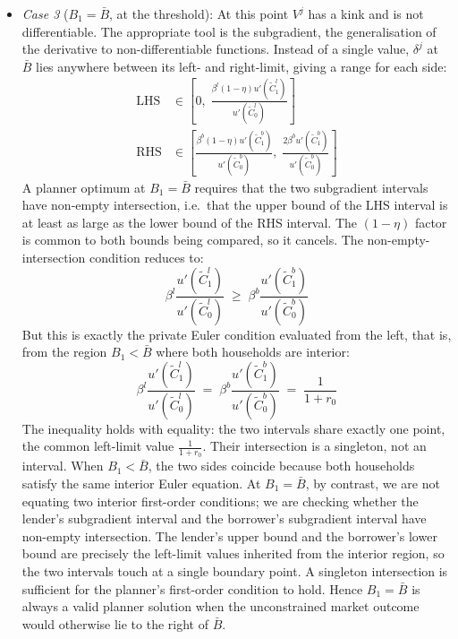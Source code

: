 \documentclass[11pt,a4paper]{article}
\begin{document}
\begin{itemize}
    \item \textit{Case 3} ($B_1 = \bar{B}$, at the threshold): At this point $V^j$ has a kink and is not differentiable. The appropriate tool is the subgradient, the generalisation of the derivative to non-differentiable functions. Instead of a single value, $\delta^j$ at $\bar{B}$ lies anywhere between its left- and right-limit, giving a range for each side:
    \begin{equation}
    \begin{aligned}
    \text{LHS} &\in \left[0,\; \frac{\beta^l(1-\eta)u'(\tilde{C}_1^l)}{u'(\tilde{C}_0^l)}\right] \\[4pt]
    \text{RHS} &\in \left[\frac{\beta^b(1-\eta)u'(\tilde{C}_1^b)}{u'(\tilde{C}_0^b)},\; \frac{2\beta^b u'(\tilde{C}_1^b)}{u'(\tilde{C}_0^b)}\right]
    \end{aligned}
    \end{equation}
    A planner optimum at $B_1 = \bar{B}$ requires that the two subgradient intervals have non-empty intersection, i.e.\ that the upper bound of the LHS interval is at least as large as the lower bound of the RHS interval. The $(1-\eta)$ factor is common to both bounds being compared, so it cancels. The non-empty-intersection condition reduces to:
    \begin{equation}
    \beta^l \frac{u'(\tilde{C}_1^l)}{u'(\tilde{C}_0^l)} \;\geq\; \beta^b \frac{u'(\tilde{C}_1^b)}{u'(\tilde{C}_0^b)}
    \end{equation}
    But this is exactly the private Euler condition evaluated from the left, that is, from the region $B_1 < \bar{B}$ where both households are interior:
    \begin{equation}
    \beta^l \frac{u'(\tilde{C}_1^l)}{u'(\tilde{C}_0^l)} \;=\; \beta^b \frac{u'(\tilde{C}_1^b)}{u'(\tilde{C}_0^b)} \;=\; \frac{1}{1+r_0}
    \end{equation}
    The inequality holds with equality: the two intervals share exactly one point, the common left-limit value $\frac{1}{1+r_0}$. Their intersection is a singleton, not an interval. When $B_1 < \bar{B}$, the two sides coincide because both households satisfy the same interior Euler equation. At $B_1 = \bar{B}$, by contrast, we are not equating two interior first-order conditions; we are checking whether the lender's subgradient interval and the borrower's subgradient interval have non-empty intersection. The lender's upper bound and the borrower's lower bound are precisely the left-limit values inherited from the interior region, so the two intervals touch at a single boundary point. A singleton intersection is sufficient for the planner's first-order condition to hold. Hence $B_1 = \bar{B}$ is always a valid planner solution when the unconstrained market outcome would otherwise lie to the right of $\bar{B}$.
\end{itemize}
\end{document}
